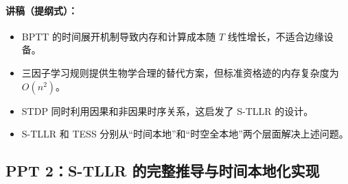 \documentclass[journal,12pt,onecolumn]{IEEEtran}
\begin{document}
\paragraph{\textbf{讲稿（提纲式）：}}
\begin{itemize}
    \item BPTT 的时间展开机制导致内存和计算成本随 \(T\) 线性增长，不适合边缘设备。
    \item 三因子学习规则提供生物学合理的替代方案，但标准资格迹的内存复杂度为 \(O(n^2)\)。
    \item STDP 同时利用因果和非因果时序关系，这启发了 S-TLLR 的设计。
    \item S-TLLR 和 TESS 分别从“时间本地”和“时空全本地”两个层面解决上述问题。
\end{itemize}

\subsection*{PPT 2：S-TLLR 的完整推导与时间本地化实现}
\end{document}
